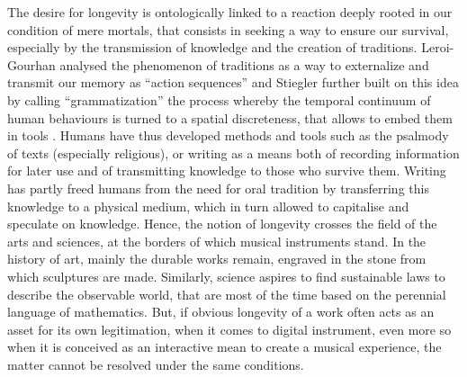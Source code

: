 The desire for longevity is ontologically linked to a reaction deeply rooted in our condition of mere mortals, that consists in seeking a way to ensure our survival, especially by the transmission of knowledge and the creation of traditions. Leroi-Gourhan analysed the phenomenon of traditions as a way to externalize and transmit our memory as “action sequences” \cite{gourhan_geste_1964} and Stiegler further built on this idea by calling “grammatization” the process whereby the temporal continuum of human behaviours is turned to a spatial discreteness, that allows to embed them in tools \cite{stiegler_for_2010}.
	Humans have thus developed methods and tools such as the psalmody of texts (especially religious), or writing as a means both of recording information for later use and of transmitting knowledge to those who survive them. Writing has partly freed humans from the need for oral tradition by transferring this knowledge to a physical medium, which in turn allowed to capitalise and speculate on knowledge.
	Hence, the notion of longevity crosses the field of the arts and sciences, at the borders of which musical instruments stand. In the history of art, mainly the durable works remain, engraved in the stone from which sculptures are made. Similarly, science aspires to find sustainable laws to describe the observable world, that are most of the time based on the perennial language of mathematics. But, if obvious longevity of a work often acts as an asset for its own legitimation, when it comes to digital instrument, even more so when it is conceived as an interactive mean to create a musical experience, the matter cannot be resolved under the same conditions.
	
